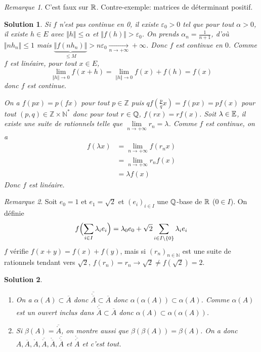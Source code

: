 \documentclass[12pt]{article}
\newtheorem{solution}{Solution}[section]
\theoremstyle{remark}
\newtheorem{remark}{Remarque}
\newcommand{\N}{\mathbb{N}} \newcommand{\Z}{\mathbb{Z}}
\begin{document}
\begin{remark}
	C'est faux sur $\mathbb{R}$. Contre-exemple: matrices de déterminant positif.
\end{remark}

\begin{solution}
	Si $f$ n'est pas continue en 0, il existe $\varepsilon_{0}>0$ tel que pour tout $\alpha>0$, il existe $h\in E$ avec $\Vert h\Vert\leqslant\alpha$ et $\Vert f(h)\Vert>\varepsilon_{0}$. On prends $\alpha_{n}=\frac{1}{n+1}$, d'où $\Vert nh_{n}\Vert\leqslant1$ mais $\underbrace{\Vert f(nh_{n})\Vert}_{\leqslant M}>n\varepsilon_{0}\xrightarrow[n\to+\infty]{}+\infty$. Donc $f$ est continue en $0$. Comme $f$ est linéaire, pour tout $x\in E$,
	$$\lim\limits_{\Vert h\Vert\to0}f(x+h)=\lim\limits_{\Vert h\Vert\to0}f(x)+f(h)=f(x)$$
	donc $f$ est continue.

	On a $f(px)=p(fx)$ pour tout $p\in\Z$ puis $qf(\frac{p}{q}x)=f(px)=pf(x)$ pour tout $(p,q)\in\Z\times\N^{*}$ donc pour tout $r\in\mathbb{Q}$, $f(rx)=rf(x)$.
	Soit $\lambda\in\mathbb{E}$, il existe une suite de rationnels telle que $\lim\limits_{n\to+\infty} r_{n}=\lambda$. Comme $f$ est continue, on a 
	\begin{align*}
		f(\lambda x)
		&=\lim\limits_{n\to+\infty}f(r_{n}x)\\
		&=\lim\limits_{n\to+\infty}r_{n}f(x)\\
		&=\lambda f(x)
	\end{align*}
	Donc $f$ est linéaire.
\end{solution}

\begin{remark}
	Soit $e_{0}=1$ et $e_{1}=\sqrt{2}$ et $(e_{i})_{i\in I}$ une $\mathbb{Q}$-base de $\mathbb{R}$ ($0\in I$). On définie 
	$$f\Bigl(\sum_{i\in I}\lambda_{i} e_{i}\Bigr)=\lambda_{0}e_{0}+\sqrt{2}\sum_{i\in I\setminus\{0\}}\lambda_{i}e_{i}$$
	$f$ vérifie $f(x+y)=f(x)+f(y)$, mais si $(r_{n})_{n\in\N}$ est une suite de rationnels tendant vers $\sqrt{2}$, $f(r_{n})=r_{n}\to\sqrt{2}\neq f(\sqrt{2})=2$.
\end{remark}

\begin{solution}
	\phantom{}
	\begin{enumerate}
		\item On a $\alpha(A)\subset \overline{A}$ donc $\overline{\mathring{\overline{A}}}\subset\overline{A}$ donc $\alpha(\alpha(A))\subset\alpha(A)$. Comme $\alpha(A)$ est un ouvert inclus dans $\overline{\mathring{\overline{A}}}\subset\overline{A}$ donc $\alpha(A)\subset\alpha(\alpha(A))$.

		\item Si $\beta(A)=\overline{\mathring{A}}$, on montre aussi que $\beta(\beta(A))=\beta(A)$. On a donc $A,\overline{A},\mathring{A},\overline{\mathring{A}},\mathring{\overline{A}},\overline{\mathring{\overline{A}}}$ et $\mathring{\overline{\mathring{A}}}$ et c'est tout.
	\end{enumerate}
\end{solution}
\end{document}
